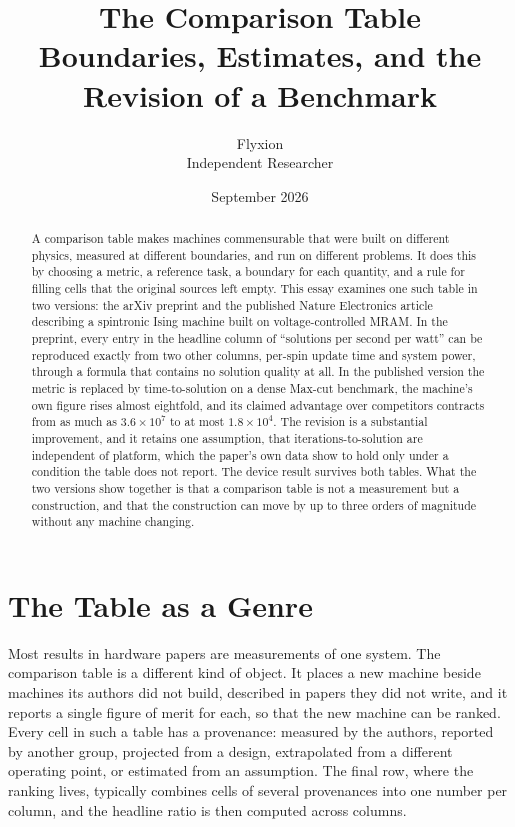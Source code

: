 \documentclass[11pt]{article}
\title{The Comparison Table\\[4pt]
\large Boundaries, Estimates, and the Revision of a Benchmark}
\author{Flyxion\\ Independent Researcher}
\date{September 2026}
\theoremstyle{definition}
\theoremstyle{remark}
\begin{document}
\maketitle

\begin{abstract}
A comparison table makes machines commensurable that were built on different physics, measured at different boundaries, and run on different problems. It does this by choosing a metric, a reference task, a boundary for each quantity, and a rule for filling cells that the original sources left empty. This essay examines one such table in two versions: the arXiv preprint and the published Nature Electronics article describing a spintronic Ising machine built on voltage-controlled MRAM. In the preprint, every entry in the headline column of ``solutions per second per watt'' can be reproduced exactly from two other columns, per-spin update time and system power, through a formula that contains no solution quality at all. In the published version the metric is replaced by time-to-solution on a dense Max-cut benchmark, the machine's own figure rises almost eightfold, and its claimed advantage over competitors contracts from as much as $3.6 \times 10^7$ to at most $1.8 \times 10^4$. The revision is a substantial improvement, and it retains one assumption, that iterations-to-solution are independent of platform, which the paper's own data show to hold only under a condition the table does not report. The device result survives both tables. What the two versions show together is that a comparison table is not a measurement but a construction, and that the construction can move by up to three orders of magnitude without any machine changing.
\end{abstract}

\section{The Table as a Genre}

Most results in hardware papers are measurements of one system. The comparison table is a different kind of object. It places a new machine beside machines its authors did not build, described in papers they did not write, and it reports a single figure of merit for each, so that the new machine can be ranked. Every cell in such a table has a provenance: measured by the authors, reported by another group, projected from a design, extrapolated from a different operating point, or estimated from an assumption. The final row, where the ranking lives, typically combines cells of several provenances into one number per column, and the headline ratio is then computed across columns.
\end{document}

